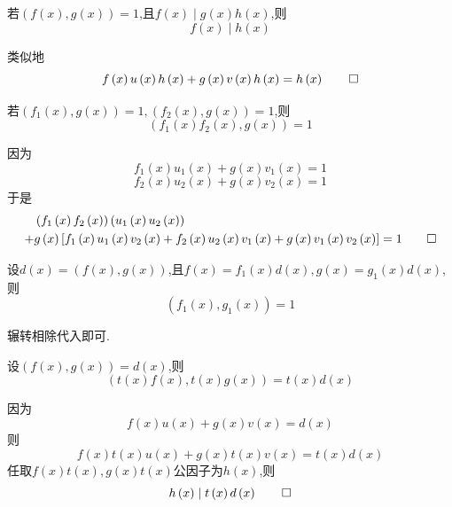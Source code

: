 \begin{green}
\begin{corollary}[分解]\label{cor:分解}
    若$\left(f\left(x\right),g\left(x\right)\right)=1$,且$f\left(x\right)\mid g\left(x\right)h\left(x\right)$,则\[
    f\left(x\right)\mid h\left(x\right)
    \]
\end{corollary}
\begin{Proof}
类似地
\[
f\left(x\right)u\left(x\right)h\left(x\right)+g\left(x\right)v\left(x\right)h\left(x\right)=h\left(x\right)
\qedhere
\]
\end{Proof}
\end{green}
\begin{green}
\begin{corollary}[素因子之积]\label{cor:素因子之积}
    若$\left(f_1\left(x\right),g\left(x\right)\right)=1,\left(f_2\left(x\right),g\left(x\right)\right)=1$,则
    \[
    \left(f_1\left(x\right)f_2\left(x\right),g\left(x\right)\right)=1
    \]
\end{corollary}
\begin{Proof}
因为\[
f_1\left(x\right)u_1\left(x\right)+g\left(x\right)v_1\left(x\right)=1
\]
\[
f_2\left(x\right)u_2\left(x\right)+g\left(x\right)v_2\left(x\right)=1
\]
于是\begin{align*}
    &\left(f_1\left(x\right)f_2\left(x\right)\right)\left(u_1\left(x\right)u_2\left(x\right)\right)\\
    +&g\left(x\right)\left[f_1\left(x\right)u_1\left(x\right)v_2\left(x\right)+f_2\left(x\right)u_2\left(x\right)v_1\left(x\right)+g\left(x\right)v_1\left(x\right)v_2\left(x\right)\right]=1
\qedhere
\end{align*}
\end{Proof}
\end{green}
\begin{green}
\begin{corollary}[最大公因式]\label{cor:最大公因式}
    设$d\left(x\right)=\left(f\left(x\right),g\left(x\right)\right)$,且$f\left(x\right)=
    f_1\left(x\right)d\left(x\right),g\left(x\right)=g_1\left(x\right)d\left(x\right)$,则\[
    \left(f_1\left(x\right),g_1\left(x\right)\right)=1
    \]
\end{corollary}
\begin{Proof}
辗转相除代入即可.
\end{Proof}
\end{green}
\begin{green}
\begin{corollary}[外乘因子]\label{cor:外乘因子}
    设$\left(f\left(x\right),g\left(x\right)\right)=d\left(x\right)$,则\[
    \left(t\left(x\right)f\left(x\right),t\left(x\right)g\left(x\right)\right)=t\left(x\right)d\left(x\right)
    \]
\end{corollary}
\begin{Proof}
因为\[
f\left(x\right)u\left(x\right)+g\left(x\right)v\left(x\right)=d\left(x\right)
\]
则\[
f\left(x\right)t\left(x\right)u\left(x\right)+g\left(x\right)t\left(x\right)v\left(x\right)=t\left(x\right)d\left(x\right)
\]
任取$f\left(x\right)t\left(x\right),g\left(x\right)t\left(x\right)$公因子为$h\left(x\right)$,则
\[
h\left(x\right)\mid t\left(x\right)d\left(x\right)
\qedhere
\]
\end{Proof}
\end{green}
